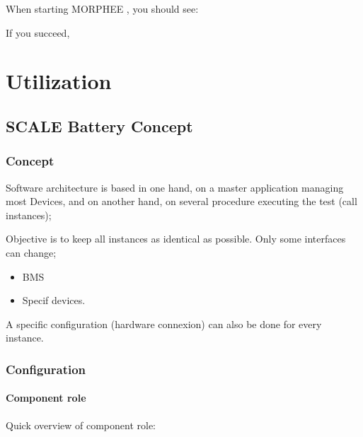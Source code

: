 \documentclass[letterpaper,10pt,english]{jupyterBook}
\begin{document}
\sphinxAtStartPar
When starting MORPHEE , you should see:

\sphinxAtStartPar
If you succeed, 


\part{Utilization}


\chapter{SCALE Battery Concept}
\label{\detokenize{10_SCALE-Battery-Concept:scale-battery-concept}}\label{\detokenize{10_SCALE-Battery-Concept::doc}}

\section{Concept}
\label{\detokenize{10_SCALE-Battery-Concept:concept}}
\sphinxAtStartPar
Software architecture is based in one hand, on a master application managing most Devices, and on another hand, on several procedure executing the test (call instances);



\sphinxAtStartPar
Objective is to keep all instances as identical as possible. Only some interfaces can change;
\begin{itemize}
\item {} 
\sphinxAtStartPar
BMS

\item {} 
\sphinxAtStartPar
Specif devices.

\end{itemize}

\sphinxAtStartPar
A specific configuration (hardware connexion) can also be done for every instance.


\section{Configuration}
\label{\detokenize{10_SCALE-Battery-Concept:configuration}}

\subsection{Component role}
\label{\detokenize{10_SCALE-Battery-Concept:component-role}}
\sphinxAtStartPar
Quick overview of component role:
\end{document}
